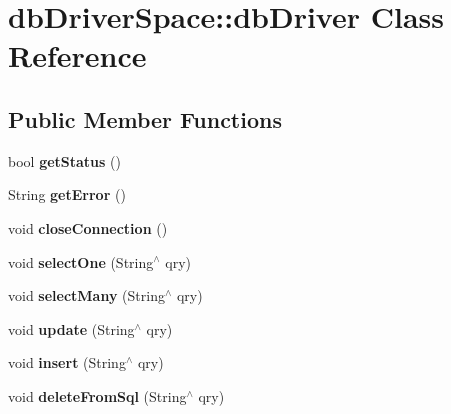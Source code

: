 \hypertarget{classdb_driver_space_1_1db_driver}{}\section{db\+Driver\+Space\+:\+:db\+Driver Class Reference}
\label{classdb_driver_space_1_1db_driver}
\subsection*{Public Member Functions}
\begin{DoxyCompactItemize}
\item 
\hypertarget{classdb_driver_space_1_1db_driver_a2cb792a0be8256967a78ec087d159143}{}\label{classdb_driver_space_1_1db_driver_a2cb792a0be8256967a78ec087d159143} 
bool {\bfseries get\+Status} ()
\item 
\hypertarget{classdb_driver_space_1_1db_driver_a7bac0a4c54ff6cee6b48762873677a89}{}\label{classdb_driver_space_1_1db_driver_a7bac0a4c54ff6cee6b48762873677a89} 
String {\bfseries get\+Error} ()
\item 
\hypertarget{classdb_driver_space_1_1db_driver_afae1bef30765720b5bc0d6007886322a}{}\label{classdb_driver_space_1_1db_driver_afae1bef30765720b5bc0d6007886322a} 
void {\bfseries close\+Connection} ()
\item 
\hypertarget{classdb_driver_space_1_1db_driver_aee1e80b0a84904a08d325b3edf3abfaa}{}\label{classdb_driver_space_1_1db_driver_aee1e80b0a84904a08d325b3edf3abfaa} 
void {\bfseries select\+One} (String$^\wedge$ qry)
\item 
\hypertarget{classdb_driver_space_1_1db_driver_afad2858516c2379248368c4fbb240a93}{}\label{classdb_driver_space_1_1db_driver_afad2858516c2379248368c4fbb240a93} 
void {\bfseries select\+Many} (String$^\wedge$ qry)
\item 
\hypertarget{classdb_driver_space_1_1db_driver_a8adc1ac03e86d52c0de7bd53cb52dbae}{}\label{classdb_driver_space_1_1db_driver_a8adc1ac03e86d52c0de7bd53cb52dbae} 
void {\bfseries update} (String$^\wedge$ qry)
\item 
\hypertarget{classdb_driver_space_1_1db_driver_ada16225ebb43a44e70d71391ff36a7af}{}\label{classdb_driver_space_1_1db_driver_ada16225ebb43a44e70d71391ff36a7af} 
void {\bfseries insert} (String$^\wedge$ qry)
\item 
\hypertarget{classdb_driver_space_1_1db_driver_acaf9ea007395cfb74bceda2073f47f27}{}\label{classdb_driver_space_1_1db_driver_acaf9ea007395cfb74bceda2073f47f27} 
void {\bfseries delete\+From\+Sql} (String$^\wedge$ qry)
\end{DoxyCompactItemize}
